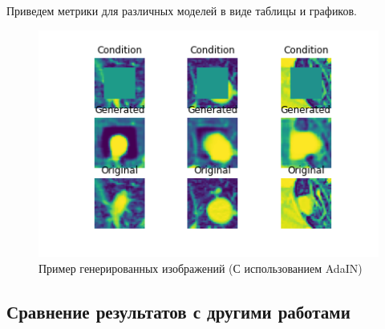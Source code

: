 Приведем метрики для различных моделей в виде таблицы и графиков. 



\begin{figure}[!h]
\includegraphics[width=\linewidth]{images/gan-results/adain.png}
\caption{Пример генерированных изображений (С использованием AdaIN)}\label{cgan-adain-results}
\centering
\end{figure}

\subsection{Сравнение результатов с другими работами}

